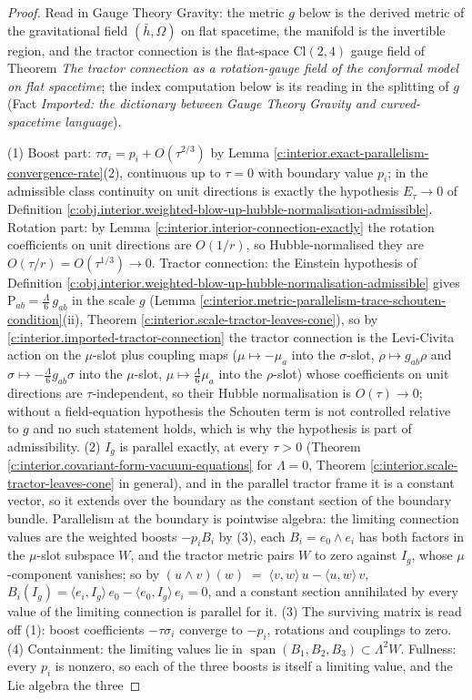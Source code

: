 \documentclass[11pt]{article}
\theoremstyle{definition}
\theoremstyle{plain}
\providecommand{\Cl}{}\renewcommand{\Cl}{\mathrm{Cl}}
\providecommand{\Sch}{}\renewcommand{\Sch}{\mathrm{P}}
\providecommand{\hb}{}\renewcommand{\hb}{\bar{h}}
\providecommand{\ip}{}\renewcommand{\ip}[2]{\langle #1, #2\rangle}
\begin{document}
\begin{proof}
Read in Gauge Theory Gravity: the metric $g$ below is the derived metric of the gravitational field $(\hb, \Omega)$ on flat spacetime, the manifold is the invertible region, and the tractor connection is the flat-space $\Cl(2,4)$ gauge field of Theorem \emph{The tractor connection as a rotation-gauge field of the conformal model on flat spacetime}; the index computation below is its reading in the splitting of $g$ (Fact \emph{Imported: the dictionary between Gauge Theory Gravity and curved-spacetime language}).

(1) Boost part: $\tau\sigma_i = p_i + O(\tau^{2/3})$ by Lemma \ref{c:interior.exact-parallelism-convergence-rate}(2), continuous up to $\tau = 0$ with boundary value $p_i$; in the admissible class continuity on unit directions is exactly the hypothesis $E_\tau \to 0$ of Definition \ref{c:obj.interior.weighted-blow-up-hubble-normalisation-admissible}. Rotation part: by Lemma \ref{c:interior.interior-connection-exactly} the rotation coefficients on unit directions are $O(1/r)$, so Hubble-normalised they are $O(\tau/r) = O(\tau^{1/3}) \to 0$. Tractor connection: the Einstein hypothesis of Definition \ref{c:obj.interior.weighted-blow-up-hubble-normalisation-admissible} gives $\Sch_{ab} = \tfrac{\Lambda}{6}\,g_{ab}$ in the scale $g$ (Lemma \ref{c:interior.metric-parallelism-trace-schouten-condition}(ii), Theorem \ref{c:interior.scale-tractor-leaves-cone}), so by \ref{c:interior.imported-tractor-connection} the tractor connection is the Levi-Civita action on the $\mu$-slot plus coupling maps ($\mu \mapsto -\mu_a$ into the $\sigma$-slot, $\rho \mapsto g_{ab}\rho$ and $\sigma \mapsto -\tfrac{\Lambda}{6}g_{ab}\sigma$ into the $\mu$-slot, $\mu \mapsto \tfrac{\Lambda}{6}\mu_a$ into the $\rho$-slot) whose coefficients on unit directions are $\tau$-independent, so their Hubble normalisation is $O(\tau) \to 0$; without a field-equation hypothesis the Schouten term is not controlled relative to $g$ and no such statement holds, which is why the hypothesis is part of admissibility. (2) $I_g$ is parallel exactly, at every $\tau > 0$ (Theorem \ref{c:interior.covariant-form-vacuum-equations} for $\Lambda = 0$, Theorem \ref{c:interior.scale-tractor-leaves-cone} in general), and in the parallel tractor frame it is a constant vector, so it extends over the boundary as the constant section of the boundary bundle. Parallelism at the boundary is pointwise algebra: the limiting connection values are the weighted boosts $-p_i B_i$ by (3), each $B_i = e_0 \wedge e_i$ has both factors in the $\mu$-slot subspace $W$, and the tractor metric pairs $W$ to zero against $I_g$, whose $\mu$-component vanishes; so by $(u \wedge v)(w) \;=\; \ip{v}{w}\,u - \ip{u}{w}\,v$, $B_i(I_g) = \ip{e_i}{I_g}\,e_0 - \ip{e_0}{I_g}\,e_i = 0$, and a constant section annihilated by every value of the limiting connection is parallel for it. (3) The surviving matrix is read off (1): boost coefficients $-\tau\sigma_i$ converge to $-p_i$, rotations and couplings to zero. (4) Containment: the limiting values lie in $\operatorname{span}(B_1, B_2, B_3) \subset \Lambda^2 W$. Fullness: every $p_i$ is nonzero, so each of the three boosts is itself a limiting value, and the Lie algebra the three 
\end{proof}
\end{document}
